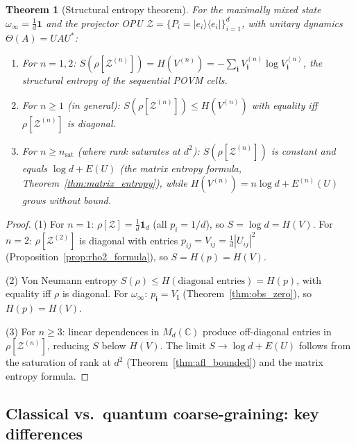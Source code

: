 \documentclass[12pt,a4paper]{article}
\newtheorem{theorem}{Theorem}[section]
\begin{document}
\begin{theorem}[Structural entropy theorem]\label{thm:structural}
For the maximally mixed state $\omega_\infty=\frac{1}{d}\mathbf{1}$
and the projector OPU $\mathcal{Z}=\{P_i=|e_i\rangle\langle e_i|\}_{i=1}^d$,
with unitary dynamics $\Theta(A)=UAU^*$:
\begin{enumerate}
  \item For $n=1,2$: $S(\rho[\mathcal{Z}^{(n)}]) = H(V^{(n)}) = -\!\sum_\mathbf{i} V_\mathbf{i}^{(n)}\log V_\mathbf{i}^{(n)}$,
        the structural entropy of the sequential POVM cells.
  \item For $n\geq 1$ (in general): $S(\rho[\mathcal{Z}^{(n)}]) \leq H(V^{(n)})$
        with equality iff $\rho[\mathcal{Z}^{(n)}]$ is diagonal.
  \item For $n\geq n_{\mathrm{sat}}$ (where rank saturates at $d^2$):
        $S(\rho[\mathcal{Z}^{(n)}])$ is constant and equals
        $\log d + E(U)$ (the matrix entropy formula, Theorem~\ref{thm:matrix_entropy}),
        while $H(V^{(n)}) = n\log d + E^{(n)}(U)$ grows without bound.
\end{enumerate}
\end{theorem}
\begin{proof}
(1) For $n=1$: $\rho[\mathcal{Z}]=\frac{1}{d}\mathbf{1}_d$ (all $p_i=1/d$),
so $S=\log d=H(V)$.  For $n=2$: $\rho[\mathcal{Z}^{(2)}]$ is diagonal with
entries $p_{ij}=V_{ij}=\frac{1}{d}|U_{ij}|^2$
(Proposition~\ref{prop:rho2_formula}), so $S = H(p) = H(V)$.

(2) Von Neumann entropy $S(\rho)\leq H(\text{diagonal entries})=H(p)$,
with equality iff $\rho$ is diagonal.
For $\omega_\infty$: $p_\mathbf{i}=V_\mathbf{i}$ (Theorem~\ref{thm:obs_zero}),
so $H(p)=H(V)$.

(3) For $n\geq 3$: linear dependences in $M_d(\mathbb{C})$ produce off-diagonal
entries in $\rho[\mathcal{Z}^{(n)}]$, reducing $S$ below $H(V)$.  The limit
$S\to\log d + E(U)$ follows from the saturation of rank at $d^2$
(Theorem~\ref{thm:afl_bounded}) and the matrix entropy formula.
\end{proof}

\subsection{Classical vs.\ quantum coarse-graining: key differences}
\end{document}
